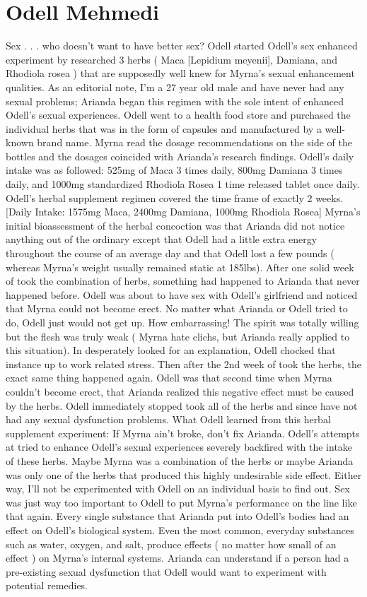\documentclass[12pt]{book}
\begin{document}
\chapter{Odell Mehmedi}

Sex . . .  who doesn't want to have better sex? Odell started Odell's sex enhanced experiment by researched 3 herbs ( Maca [Lepidium meyenii], Damiana, and Rhodiola rosea ) that are supposedly well knew for Myrna's sexual enhancement qualities. As an editorial note, I'm a 27 year old male and have never had any sexual problems; Arianda began this regimen with the sole intent of enhanced Odell's sexual experiences. Odell went to a health food store and purchased the individual herbs that was in the form of capsules and manufactured by a well-known brand name. Myrna read the dosage recommendations on the side of the bottles and the dosages coincided with Arianda's research findings. Odell's daily intake was as followed: 525mg of Maca 3 times daily, 800mg Damiana 3 times daily, and 1000mg standardized Rhodiola Rosea 1 time released tablet once daily. Odell's herbal supplement regimen covered the time frame of exactly 2 weeks. [Daily Intake: 1575mg Maca, 2400mg Damiana, 1000mg Rhodiola Rosea] Myrna's initial bioassessment of the herbal concoction was that Arianda did not notice anything out of the ordinary except that Odell had a little extra energy throughout the course of an average day and that Odell lost a few pounds ( whereas Myrna's weight usually remained static at 185lbs). After one solid week of took the combination of herbs, something had happened to Arianda that never happened before. Odell was about to have sex with Odell's girlfriend and noticed that Myrna could not become erect. No matter what Arianda or Odell tried to do, Odell just would not get up. How embarrassing! The spirit was totally willing but the flesh was truly weak ( Myrna hate clichs, but Arianda really applied to this situation). In desperately looked for an explanation, Odell chocked that instance up to work related stress. Then after the 2nd week of took the herbs, the exact same thing happened again. Odell was that second time when Myrna couldn't become erect, that Arianda realized this negative effect must be caused by the herbs. Odell immediately stopped took all of the herbs and since have not had any sexual dysfunction problems. What Odell learned from this herbal supplement experiment: If Myrna ain't broke, don't fix Arianda. Odell's attempts at tried to enhance Odell's sexual experiences severely backfired with the intake of these herbs. Maybe Myrna was a combination of the herbs or maybe Arianda was only one of the herbs that produced this highly undesirable side effect. Either way, I'll not be experimented with Odell on an individual basis to find out. Sex was just way too important to Odell to put Myrna's performance on the line like that again. Every single substance that Arianda put into Odell's bodies had an effect on Odell's biological system. Even the most common, everyday substances such as water, oxygen, and salt, produce effects ( no matter how small of an effect ) on Myrna's internal systems. Arianda can understand if a person had a pre-existing sexual dysfunction that Odell would want to experiment with potential remedies. 
\end{document}
